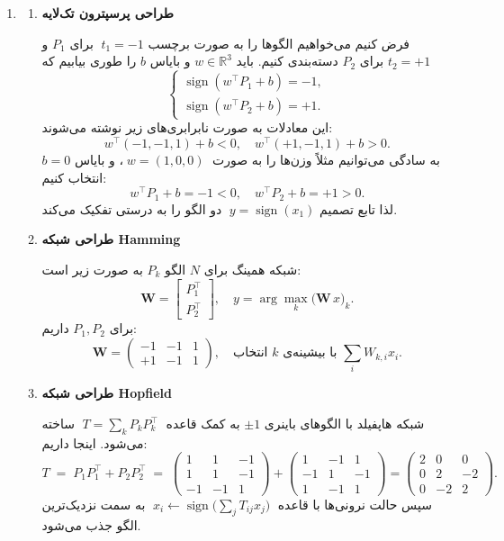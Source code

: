 \begin{enumerate}
\begin{itemize}
	\end{itemize}
	
	
	
	


	\item 
	
	\begin{enumerate}
		\item {\bf طراحی پرسپترون تک‌لایه}
		
		فرض کنیم می‌خواهیم الگوها را به صورت برچسب
		\(\;t_1=-1\) برای \(P_1\) و \(t_2=+1\) برای \(P_2\) دسته‌بندی کنیم.
		باید \(w\in\mathbb{R}^3\) و بایاس \(b\) را طوری بیابیم که
		\[
		\begin{cases}
			\operatorname{sign}(w^\top P_1 + b) = -1,\\
			\operatorname{sign}(w^\top P_2 + b) = +1.
		\end{cases}
		\]
		این معادلات به صورت نابرابری‌های زیر نوشته می‌شوند:
		\[
		w^\top\!(-1,-1,1) + b < 0,
		\quad
		w^\top\!(+1,-1,1) + b > 0.
		\]
		به سادگی می‌توانیم مثلاً وزن‌ها را به صورت
		\(\;w = (1,0,0)\;\)، و بایاس \(b=0\) انتخاب کنیم:
		\[
		w^\top P_1 + b = -1 < 0,\quad
		w^\top P_2 + b = +1 > 0.
		\]
		لذا تابع تصمیم
		\(\;y = \operatorname{sign}(x_1)\)
		دو الگو را به درستی تفکیک می‌کند.
		
		\item {\bf طراحی شبکه Hamming}
		
		شبکه همینگ برای \(N\) الگو \(P_k\) به صورت زیر است:
		\[
		\textbf{W} = 
		\begin{bmatrix}
			P_1^\top \\ P_2^\top
		\end{bmatrix}, 
		\quad
		y = \arg\max_{k}\bigl(\textbf{W}\,x\bigr)_k.
		\]
		برای \(P_1,P_2\) داریم:
		\[
		\textbf{W} =
		\begin{pmatrix}
			-1 & -1 & 1\\
			+1 & -1 & 1
		\end{pmatrix},
		\quad
		\text{انتخاب \(k\) با بیشینه‌ی \(\sum_i W_{k,i}x_i\).}
		\]
		
		\item {\bf طراحی شبکه Hopfield}
		
		شبکه هاپفیلد با الگوهای باینری \(\pm1\) به کمک قاعده
		\(\;T = \sum_k P_k P_k^\top\;\) ساخته می‌شود. اینجا داریم:
		\[
		T \;=\; P_1P_1^\top + P_2P_2^\top
		\;=\;
		\begin{pmatrix}
			1 & 1 & -1\\
			1 & 1 & -1\\
			-1 & -1 & 1
		\end{pmatrix}
		+
		\begin{pmatrix}
			1 & -1 & 1\\
			-1 & 1 & -1\\
			1 & -1 & 1
		\end{pmatrix}
		=
		\begin{pmatrix}
			2 & 0 & 0\\
			0 & 2 & -2\\
			0 & -2 & 2
		\end{pmatrix}.
		\]
		سپس حالت نرونی‌ها با قاعده
		\(\;x_i \leftarrow \operatorname{sign}\bigl(\sum_j T_{ij}x_j\bigr)\;\)
		به سمت نزدیک‌ترین الگو جذب می‌شود.
		

\end{enumerate}
\end{enumerate}
